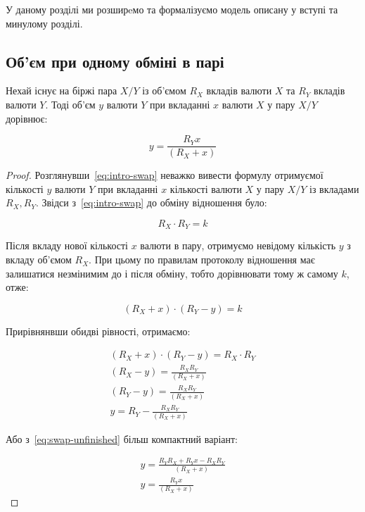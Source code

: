\documentclass[../index.tex]{subfiles}
\begin{document}
У даному розділі ми розширeмо та формалізуємо модель описану у вступі та
минулому розділі.

\subsection{Об'єм при одному обміні в парі}

\begin{lemma} Нехай існує на біржі пара \(X/Y\) із об'ємом \(R_{X}\) вкладів
	валюти \(X\) та \(R_{Y}\) вкладів валюти \(Y\). Тоді об'єм \(y\) валюти \(Y\)
	при вкладанні \(x\) валюти \(X\) у пару \(X/Y\) дорівнює:

	\begin{equation}\label{eq:swap}
		y = \frac{R_{Y}x}{(R_{X} + x)}
	\end{equation}
\end{lemma}

\begin{proof}
	Розглянувши~\eqref{eq:intro-swap} неважко вивести формулу отримуємої кількості
	\(y\) валюти \(Y\) при вкладанні \(x\) кількості валюти \(X\) у пару \(X/Y\)
	із вкладами \(R_{X}, R_{Y}\). Звідси з~\eqref{eq:intro-swap} до обміну
	відношення було:

	\begin{equation*}
		R_{X} \cdot R_{Y} = k
	\end{equation*}

	Після вкладу нової кількості \(x\) валюти в пару, отримуємо невідому кількість
	\(y\) з вкладу об'ємом \(R_{X}\). При цьому по правилам протоколу
	відношення має залишатися незмінимим до і після обміну, тобто дорівнювати тому
	ж самому \(k\), отже:

	\begin{equation*}
		(R_{X} + x) \cdot (R_{Y} - y) = k
	\end{equation*}

	Прирівнянвши обидві рівності, отримаємо:

	\begin{equation}\label{eq:swap-unfinished}
		\begin{aligned}
			(R_{X} + x) \cdot (R_{Y} - y) = R_{X} \cdot R_{Y} \\
			(R_{X} - y) = \frac{R_{X} R_{Y}}{(R_{X} + x)}         \\
			(R_{Y} - y) = \frac{R_{X} R_{Y}}{(R_{X} + x)}     \\
			y = R_{Y} - \frac{R_{X} R_{Y}}{(R_{X} + x)}
		\end{aligned}
	\end{equation}

	Або з~\eqref{eq:swap-unfinished} більш компактний варіант:

	\begin{equation}
		\begin{aligned}
			y = \frac{R_{Y} R_{X} + R_{Y}x - R_{X}R_{Y}}{(R_{X} + x)} \\
			y = \frac{R_{Y}x}{(R_{X} + x)}
		\end{aligned}
	\end{equation}
\end{proof}
\end{document}
